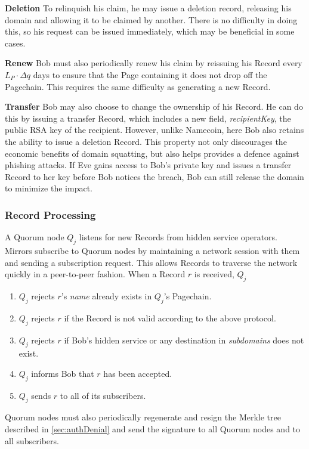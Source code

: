 \documentclass[conference]{IEEEtran}
\begin{document}
\textbf{Deletion} To relinquish his claim, he may issue a deletion record, releasing his domain and allowing it to be claimed by another. There is no difficulty in doing this, so his request can be issued immediately, which may be beneficial in some cases.

\textbf{Renew} Bob must also periodically renew his claim by reissuing his Record every $ L_{P} \cdot \Delta q $ days to ensure that the Page containing it does not drop off the Pagechain. This requires the same difficulty as generating a new Record.

\textbf{Transfer} Bob may also choose to change the ownership of his Record. He can do this by issuing a transfer Record, which includes a new field, \emph{recipientKey}, the public RSA key of the recipient. However, unlike Namecoin, here Bob also retains the ability to issue a deletion Record. This property not only discourages the economic benefits of domain squatting, but also helps provides a defence against phishing attacks. If Eve gains access to Bob's private key and issues a transfer Record to her key before Bob notices the breach, Bob can still release the domain to minimize the impact.

\subsubsection{Record Processing}

A Quorum node $ Q_{j} $ listens for new Records from hidden service operators. Mirrors subscribe to Quorum nodes by maintaining a network session with them and sending a subscription request. This allows Records to traverse the network quickly in a peer-to-peer fashion. When a Record $ r $ is received, $ Q_{j} $

\begin{enumerate}
	\item $ Q_{j} $ rejects $ r $'s \emph{name} already exists in $ Q_{j} $'s Pagechain.
	\item $ Q_{j} $ rejects $ r $ if the Record is not valid according to the above protocol.
	\item $ Q_{j} $ rejects $ r $ if Bob's hidden service or any destination in \emph{subdomains} does not exist.
	\item $ Q_{j} $ informs Bob that $ r $ has been accepted.
	\item $ Q_{j} $ sends $ r $ to all of its subscribers.
\end{enumerate}

Quorum nodes must also periodically regenerate and resign the Merkle tree described in \ref{sec:authDenial} and send the signature to all Quorum nodes and to all subscribers.
\end{document}
